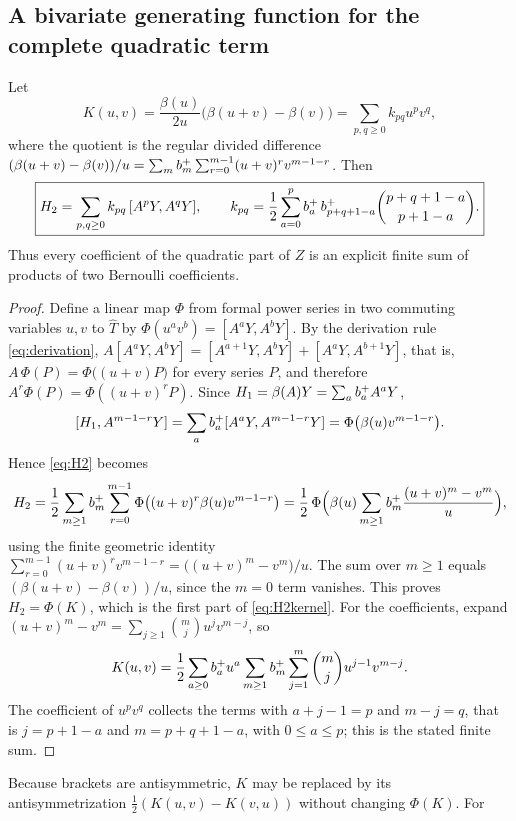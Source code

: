 \subsection{A bivariate generating function for the complete quadratic term}
\begin{theorem}\label{thm:kernel}
Let
\begin{equation}\label{eq:K}
 K(u,v)=\frac{\beta(u)}{2u}\bigl(\beta(u+v)-\beta(v)\bigr)
 =\sum_{p,q\geq0}k_{pq}u^pv^q,
\end{equation}
where the quotient is the regular divided difference
$(\beta(u+v)-\beta(v))/u=\sum_mb^{+}_{m}\sum_{r=0}^{m-1}(u+v)^rv^{m-1-r}$.
Then
\begin{equation}\label{eq:H2kernel}
 \boxed{\displaystyle
 H_2=\sum_{p,q\geq0}k_{pq}\,[A^pY,A^qY],\qquad
 k_{pq}=\frac12\sum_{a=0}^{p}b^{+}_{a}\,b^{+}_{p+q+1-a}
 \binom{p+q+1-a}{p+1-a}.}
\end{equation}
Thus every coefficient of the quadratic part of $Z$ is an explicit finite
sum of products of two Bernoulli coefficients.
\end{theorem}
\begin{proof}
Define a linear map $\Phi$ from formal power series in two commuting
variables $u,v$ to $\widehat T$ by $\Phi(u^av^b)=[A^aY,A^bY]$. By the
derivation rule \eqref{eq:derivation},
$A[A^aY,A^bY]=[A^{a+1}Y,A^bY]+[A^aY,A^{b+1}Y]$, that is,
$A\,\Phi(P)=\Phi\bigl((u+v)P\bigr)$ for every series $P$, and therefore
$A^r\Phi(P)=\Phi((u+v)^rP)$. Since $H_1=\beta(A)Y=\sum_ab^{+}_{a}A^aY$,
\[
 [H_1,A^{m-1-r}Y]=\sum_ab^{+}_{a}[A^aY,A^{m-1-r}Y]=\Phi\bigl(\beta(u)v^{m-1-r}\bigr).
\]
Hence \eqref{eq:H2} becomes
\[
 H_2=\frac12\sum_{m\geq1}b^{+}_{m}\sum_{r=0}^{m-1}
 \Phi\bigl((u+v)^r\beta(u)v^{m-1-r}\bigr)
 =\frac12\,\Phi\Bigl(\beta(u)\sum_{m\geq1}b^{+}_{m}\frac{(u+v)^m-v^m}{u}\Bigr),
\]
using the finite geometric identity
$\sum_{r=0}^{m-1}(u+v)^rv^{m-1-r}=\bigl((u+v)^m-v^m\bigr)/u$. The sum over
$m\geq1$ equals $(\beta(u+v)-\beta(v))/u$, since the $m=0$ term vanishes.
This proves $H_2=\Phi(K)$, which is the first part of \eqref{eq:H2kernel}.
For the coefficients, expand
$(u+v)^m-v^m=\sum_{j\geq1}\binom mju^jv^{m-j}$, so
\[
 K(u,v)=\frac12\sum_{a\geq0}b^{+}_{a}u^a\sum_{m\geq1}b^{+}_{m}
 \sum_{j=1}^{m}\binom mju^{j-1}v^{m-j}.
\]
The coefficient of $u^pv^q$ collects the terms with $a+j-1=p$ and $m-j=q$,
that is $j=p+1-a$ and $m=p+q+1-a$, with $0\leq a\leq p$; this is the stated
finite sum.
\end{proof}
Because brackets are antisymmetric, $K$ may be replaced by its
antisymmetrization $\frac12(K(u,v)-K(v,u))$ without changing $\Phi(K)$. For
